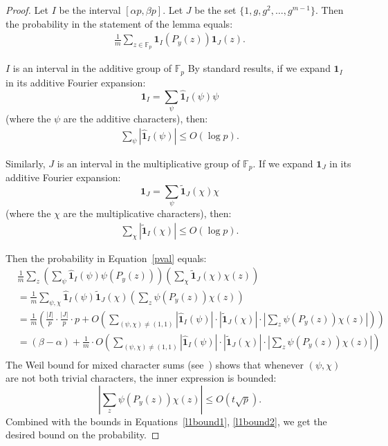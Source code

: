 \documentclass{article}
\newcommand{\F}{\mathbb{F}}
\newcommand{\one}{{\mathbf{1}}}
\begin{document}
\begin{proof}
 Let $I$ be the interval $[\alpha p, \beta p]$. Let $J$ be the set
 $\{1, g, g^2, \ldots, g^{m-1}\}$. Then the probability in the statement of the lemma equals:
 \begin{align}
 \label{pval}
 \frac{1}{m} \sum_{ z \in \F_p}  {\one}_{I}(P_y(z)){\one}_J(z).
 \end{align}
 
 $I$ is an interval in the additive group of $\F_p$
 By standard results, if we expand $\one_I$ in its additive Fourier expansion:
 $$ \one_I = \sum_\psi \widehat{\one}_I(\psi) \psi$$
 (where the $\psi$ are the additive characters), then:
 \begin{align}
 \label{l1bound1}
 \sum_{\psi } |\widehat{\one}_I(\psi)| \leq O( \log p).
 \end{align}
 
 Similarly, $J$ is an interval in the multiplicative group of $\F_p$.
 If we expand $\one_J$ in its additive Fourier expansion:
 $$ \one_J = \sum_\psi \widetilde{\one}_J(\chi) \chi$$
 (where the $\chi$ are the multiplicative characters), then:
 \begin{align}
 \label{l1bound2}
 \sum_{\chi} |\widetilde{\one}_I(\chi)| \leq O( \log p).
 \end{align}
 
 Then the probability in Equation~\eqref{pval} equals:
 \begin{align*} &\frac{1}{m}\sum_{z} \left( \sum_{\psi} \widehat{\one}_I(\psi) \psi(P_y(z)) \right) \left( \sum_{\chi} \widetilde{\one}_J(\chi) \chi(z) \right)\\
  &= \frac{1}{m}\sum_{\psi, \chi} \widehat{\one}_I(\psi) \widetilde{\one}_J(\chi) \left(\sum_{z} \psi(P_y(z)) \chi(z) \right)\\
  &= \frac{1}{m} \left( \frac{|I|}{p}\cdot \frac{|J|}{p} \cdot p + O\left(\sum_{(\psi, \chi) \neq (1,1)} |\widehat{\one}_I(\psi)|\cdot |\widetilde{\one}_J(\chi)| \cdot \left|\sum_{z} \psi(P_y(z)) \chi(z) \right|\right) \right)\\
  &= (\beta-\alpha) + \frac{1}{m} \cdot  O\left(\sum_{(\psi, \chi) \neq (1,1)} |\widehat{\one}_I(\psi)| \cdot | \widetilde{\one}_J(\chi) | \cdot \left|\sum_{z} \psi(P_y(z)) \chi(z) \right|\right) \\
 \end{align*}
The Weil bound for mixed character sums (see~\cite{Schmidtbook}) shows that whenever
$(\psi, \chi)$ are not both trivial characters, the inner expression is bounded:
$$\left|\sum_{z} \psi(P_y(z)) \chi(z) \right| \leq O( t \sqrt{p}).$$
Combined with the bounds in Equations~\eqref{l1bound1}, \eqref{l1bound2}, we get the desired bound on the probability.
\end{proof}
\end{document}
